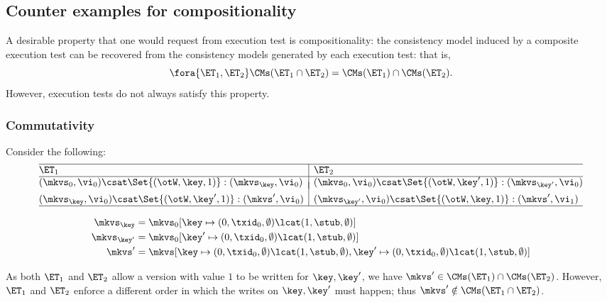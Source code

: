 \subsection{Counter examples for compositionality}
\label{sec:counter-examples-composition}

A desirable property that one would request from execution test is compositionality:
the consistency model induced by a composite execution test can be recovered from the consistency 
models generated by each execution test: that is, 
\[ 
\fora{ \ET_1, \ET_2 } \CMs(\ET_1 \cap \ET_2) = \CMs(\ET_1) \cap \CMs(\ET_2).
\]
However, execution tests do not always satisfy this property.

\subsubsection{Commutativity}
Consider the following:
%
\[
\begin{array}{@{}l | l@{}}
    \hline
    \ET_1 & \ET_2 \\
%    
    \hline
    (\mkvs_{0}, \vi_{0}) \csat \Set{(\otW, \key, 1)} : ( \mkvs_{\key}, \vi_{0})
    &
    (\mkvs_{0}, \vi_{0}) \csat \Set{(\otW, \key', 1)} : ( \mkvs_{\key'}, \vi_{0}) 
    \vspace*{-7pt}\\\\
    (\mkvs_{\key}, \vi_{0}) \csat  \Set{(\otW, \key', 1)} : (\mkvs',\vi_{0}) 
    &
    (\mkvs_{\key'}, \vi_{0}) \csat \Set{(\otW, \key, 1)} : (\mkvs',\vi_{1}) 
    \\
\hline
\end{array}
\]%
 
\begin{align*}
    \mkvs_{\key} & = \mkvs_{0}[\key \mapsto (0, \txid_{0}, \emptyset) \lcat (1, \stub, \emptyset)] \\
    \mkvs_{\key'} & = \mkvs_{0}[\key' \mapsto (0, \txid_{0}, \emptyset) \lcat (1, \stub, \emptyset)] \\
    \mkvs' & = \mkvs[\key \mapsto (0, \txid_{0}, \emptyset) \lcat (1, \stub, \emptyset) 
                ,\key' \mapsto (0, \txid_{0}, \emptyset) \lcat (1, \stub, \emptyset)] \\
\end{align*}
%

As both $\ET_1$ and $\ET_2$ allow a version with value $1$ to be written for 
$\key, \key'$,  we have $\mkvs' \in \CMs(\ET_1) \cap \CMs(\ET_2)$. 
However, $\ET_1$ and $\ET_2$ enforce a different order in which the writes on $\key, \key'$ must happen; 
thus $\mkvs' \notin \CMs(\ET_1 \cap \ET_2)$. 

